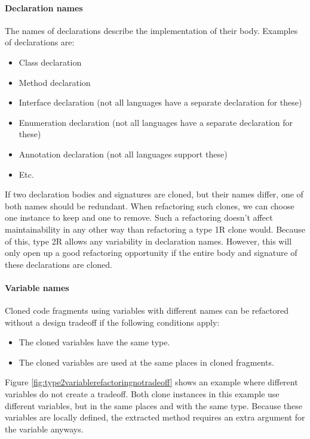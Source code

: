 \paragraph{Declaration names}
The names of declarations describe the implementation of their body. Examples of declarations are:
\begin{itemize}
  \item Class declaration
  \item Method declaration
  \item Interface declaration (not all languages have a separate declaration for these)
  \item Enumeration declaration (not all languages have a separate declaration for these)
  \item Annotation declaration (not all languages support these)
  \item Etc.
\end{itemize}
If two declaration bodies and signatures are cloned, but their names differ, one of both names should be redundant. When refactoring such clones, we can choose one instance to keep and one to remove. Such a refactoring doesn't affect maintainability in any other way than refactoring a type 1R clone would. Because of this, type 2R allows any variability in declaration names. However, this will only open up a good refactoring opportunity if the entire body and signature of these declarations are cloned.

\paragraph{Variable names}
Cloned code fragments using variables with different names can be refactored without a design tradeoff if the following conditions apply:

\begin{itemize}
  \item The cloned variables have the same type.
  \item The cloned variables are used at the same places in cloned fragments.
\end{itemize}

Figure \ref{fig:type2variablerefactoringnotradeoff} shows an example where different variables do not create a tradeoff. Both clone instances in this example use different variables, but in the same places and with the same type. Because these variables are locally defined, the extracted method requires an extra argument for the variable anyways. %

